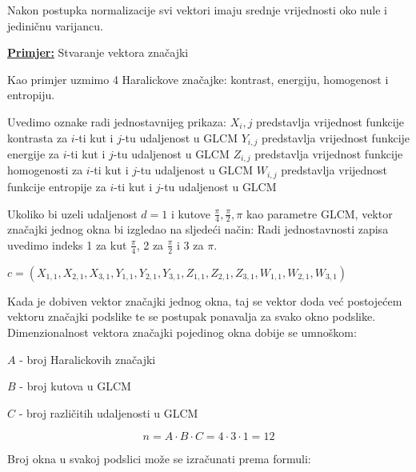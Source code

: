 \documentclass[times, utf8, zavrsni]{fer}
\begin{document}
Nakon postupka normalizacije svi vektori imaju srednje vrijednosti oko nule
i jediničnu varijancu. 

\bigbreak
\underline{\textbf{Primjer:}} Stvaranje vektora značajki
\bigbreak

Kao primjer uzmimo 4 Haralickove značajke: kontrast, energiju, homogenost i entropiju. 

\bigbreak

Uvedimo oznake radi jednostavnijeg prikaza: 
\newline \(X_i,j\) predstavlja vrijednost funkcije kontrasta za \(i\)-ti
kut i \(j\)-tu udaljenost u GLCM
\newline \(Y_{i,j}\) predstavlja vrijednost funkcije energije za \(i\)-ti
kut i \(j\)-tu udaljenost u GLCM
\newline \(Z_{i,j}\) predstavlja vrijednost funkcije homogenosti za \(i\)-ti
kut i \(j\)-tu udaljenost u GLCM
\newline \(W_{i,j}\) predstavlja vrijednost funkcije entropije za \(i\)-ti
kut i \(j\)-tu udaljenost u GLCM

\bigbreak

Ukoliko bi uzeli udaljenost \(d=1\) i kutove \(\frac{\pi}{4}, \frac{\pi}{2}, \pi\)
kao parametre GLCM, vektor značajki jednog okna bi izgledao na sljedeći način:
\bigbreak
Radi jednostavnosti zapisa uvedimo indeks 1 za kut \(\frac{\pi}{4}\), 2 za
\(\frac{\pi}{2}\) i 3 za \(\pi\).

\bigbreak

\(
c = \left(X_{1,1}, X_{2,1}, X_{3,1}, Y_{1,1}, Y_{2,1}, Y_{3,1}, Z_{1,1}, 
Z_{2,1}, Z_{3,1}, W_{1,1}, W_{2,1}, W_{3,1}\right)
\)

\bigbreak

Kada je dobiven vektor značajki jednog okna, taj se vektor doda već postojećem 
vektoru značajki podslike te se postupak ponavalja za svako okno podslike.
\newline
Dimenzionalnost vektora značajki pojedinog okna dobije se umnoškom:

\begin{center}

\(A\) - broj Haralickovih značajki

\(B\) - broj kutova u GLCM

\(C\) - broj različitih udaljenosti u GLCM

\end{center}
\[
n = A \cdot B \cdot C = 4 \cdot 3 \cdot 1 = 12
\]

Broj okna u svakoj podslici može se izračunati prema formuli:
\end{document}
